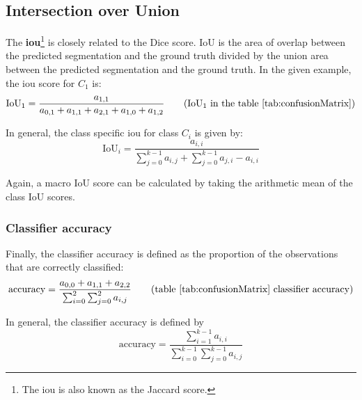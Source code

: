 \subsection{Intersection over Union}

The \textbf{\acrfull{iou}}\footnote{The \acrshort{iou} is also known as the Jaccard score.} is closely related to the Dice score.
IoU is the area of overlap between the predicted segmentation and the ground truth divided by the union area between the predicted segmentation and the ground truth.
In the given example, the \acrshort{iou} score for $C_1$ is:
\begin{equation}
    \text{IoU}_1 = \frac{a_{1,1}}{a_{0,1}+a_{1,1}+a_{2,1}+a_{1,0}+a_{1,2}} \tag{IoU$_1$ in the table \ref{tab:confusionMatrix}}
\end{equation}

In general, the class specific \acrfull{iou} for class $C_i$ is given by:
\begin{equation}
    \text{IoU}_i = \frac{a_{i,i}}{\sum_{j=0}^{k-1} a_{i, j} + \sum_{j=0}^{k-1} a_{j,i} - a_{i,i}} 
\end{equation}

Again, a macro IoU score can be calculated by taking the arithmetic mean of the class IoU scores.

\subsubsection{Classifier accuracy}

Finally, the classifier accuracy is defined as the proportion of the observations that are correctly classified:
\begin{equation}
    \text{accuracy} = \frac{a_{0,0} + a_{1,1} + a_{2,2}}{\sum_{i=0}^{2} \sum_{j=0}^{2} a_{i,j}   } \tag{table \ref{tab:confusionMatrix} classifier accuracy}
\end{equation}

In general, the classifier accuracy is defined by 
\begin{equation}
    \text{accuracy} = \frac{\sum_{i=1}^{k-1}a_{i,i}}{\sum_{i=0}^{k-1} \sum_{j=0}^{k-1} a_{i,j}   } 
\end{equation}


